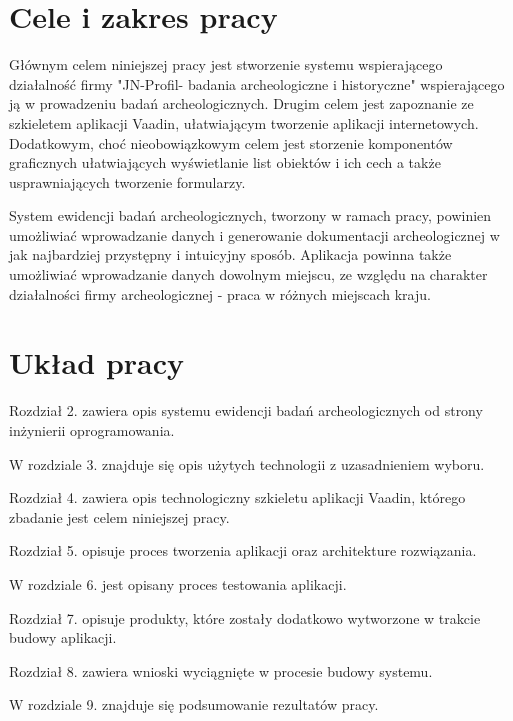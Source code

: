 \section{Cele i zakres pracy}
Głównym celem niniejszej pracy jest stworzenie systemu wspierającego działalność firmy "JN-Profil- badania archeologiczne i historyczne"  wspierającego ją w prowadzeniu badań archeologicznych. Drugim celem jest zapoznanie ze szkieletem aplikacji Vaadin, ułatwiającym tworzenie aplikacji internetowych. Dodatkowym, choć nieobowiązkowym celem jest storzenie komponentów graficznych ułatwiających wyświetlanie list obiektów i ich cech a także usprawniających tworzenie formularzy. 

System ewidencji badań archeologicznych, tworzony w ramach pracy, powinien umożliwiać wprowadzanie danych i generowanie dokumentacji archeologicznej w jak najbardziej przystępny i intuicyjny sposób. Aplikacja powinna także umożliwiać wprowadzanie danych dowolnym miejscu, ze względu na charakter działalności firmy archeologicznej - praca w różnych miejscach kraju.
\section{Układ pracy}
Rozdział 2. zawiera opis systemu ewidencji badań archeologicznych od strony inżynierii oprogramowania.

W rozdziale 3. znajduje się opis użytych technologii z uzasadnieniem wyboru.

Rozdział 4. zawiera opis technologiczny szkieletu aplikacji Vaadin, którego zbadanie jest celem niniejszej pracy.

Rozdział 5. opisuje proces tworzenia aplikacji oraz architekture rozwiązania.

W rozdziale 6. jest opisany proces testowania aplikacji.

Rozdział 7. opisuje produkty, które zostały dodatkowo wytworzone w trakcie budowy aplikacji.

Rozdział 8. zawiera wnioski wyciągnięte w procesie budowy systemu.

W rozdziale 9. znajduje się podsumowanie rezultatów pracy.

